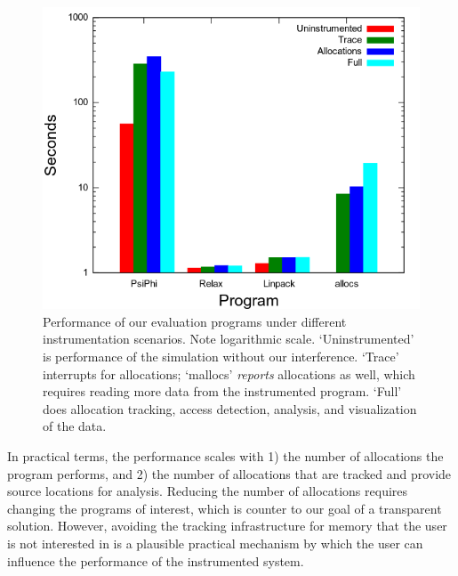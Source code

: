 
\begin{figure}
  \includegraphics[width=\linewidth]{images/dbg/mtrace/performance}

  \caption{Performance of our evaluation programs under different
  instrumentation scenarios. Note logarithmic scale.  `Uninstrumented'
  is performance of the simulation without our interference. `Trace'
  interrupts for allocations; `mallocs' \emph{reports} allocations as
  well, which requires reading more data from the instrumented program.
  `Full' does allocation tracking, access detection, analysis, and
  visualization of the data.}

  \label{fig:performance}
\end{figure}

In practical terms, the performance scales with 1) the number of
allocations the program performs, and 2) the number of allocations that
are tracked and provide source locations for analysis.  Reducing the
number of allocations requires changing the programs of interest, which
is counter to our goal of a transparent solution.  However, avoiding
the tracking infrastructure for memory that the user is not interested
in is a plausible practical mechanism by which the user can influence
the performance of the instrumented system.


